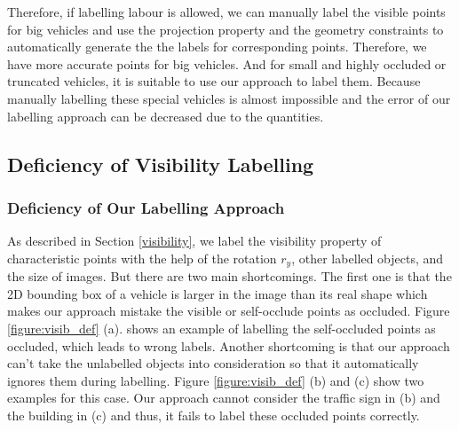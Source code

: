 \documentclass[a4paper,12pt]{article}
\begin{document}
Therefore, if labelling labour is allowed, we can manually label the visible points for big vehicles and use the projection property and the geometry constraints to automatically generate the the labels for corresponding points. Therefore, we have more accurate points for big vehicles. And for small and highly occluded or truncated vehicles, it is suitable to use our approach to label them. Because manually labelling these special vehicles is almost impossible and the error of our labelling approach can be decreased due to the quantities.


\subsection{Deficiency of Visibility Labelling}
\subsubsection{Deficiency of Our Labelling Approach}
As described in Section \ref{visibility}, we label the visibility property of characteristic points with the help of the rotation $r_y$, other labelled objects, and the size of images. But there are two main shortcomings. The first one is that the 2D bounding box of a vehicle is larger in the image than its real shape which makes our approach mistake the visible or self-occlude points as occluded. Figure \ref{figure:visib_def} (a). shows an example of labelling the self-occluded points as occluded, which leads to wrong labels. Another shortcoming is that our approach can't take the unlabelled objects into consideration so that it automatically ignores them during labelling. Figure \ref{figure:visib_def} (b) and (c) show two examples for this case. Our approach cannot consider the traffic sign in (b) and the building in (c) and thus, it fails to label these occluded points correctly.
\end{document}
